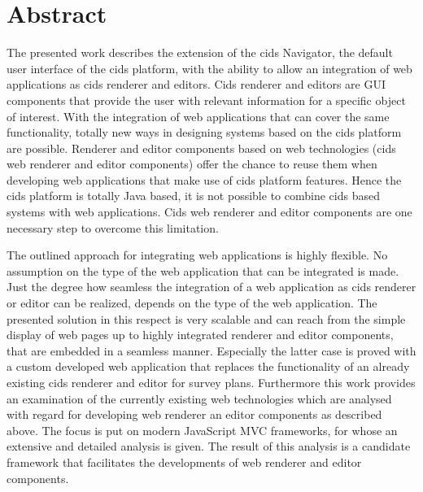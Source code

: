 \chapter*{Abstract}

The presented work describes the extension of the cids Navigator, the default user interface of the cids platform, with the ability to allow an integration of web applications as cids renderer and editors. 
Cids renderer and editors are GUI components that provide the user with relevant information for a specific object of interest. 
With the integration of web applications that can cover the same functionality, totally new ways in designing systems based on the cids platform are possible. 
Renderer and editor components based on web technologies (cids web renderer and editor components) offer the chance to reuse them when developing web applications that make use of cids platform features. 
Hence the cids platform is totally Java based, it is not possible to combine cids based systems with web applications. 
Cids web renderer and editor components are one necessary step to overcome this limitation.

The outlined approach for integrating web applications is highly flexible. 
No assumption on the type of the web application that can be integrated is made. 
Just the degree how seamless the integration of a web application as cids renderer or editor can be realized, depends on the type of the web application. 
The presented solution in this respect is very scalable and can reach from the simple display of web pages up to highly integrated renderer and editor components, that are embedded in a seamless manner. 
Especially the latter case is proved with a custom developed web application that replaces the functionality of an already existing cids renderer and editor for survey plans.
Furthermore this work provides an examination of the currently existing web technologies which are analysed with regard for developing web renderer an editor components as described above. 
The focus is put on modern JavaScript MVC frameworks, for whose an extensive and detailed analysis is given. 
The result of this analysis is a candidate framework that facilitates the developments of web renderer and editor components.

